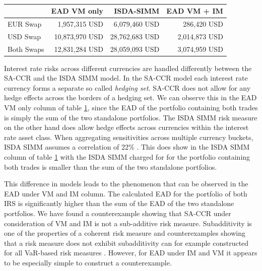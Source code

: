 \documentclass[../Thesis_AHoecherl.tex]{subfiles}
\begin{document}
    \begin{table}[htbp]
        \centering
        \begin{tabular}{l||r|r|r}
                & EAD VM only &ISDA-SIMM & EAD VM + IM \\
                \toprule
        EUR Swap & 1,957,315 USD & 6,079,460 USD & 286,420 USD \\
        USD Swap & 10,873,970 USD & 28,762,683 USD & 2,014,873 USD \\
        Both Swaps & 12,831,284 USD & 28,059,093 USD & 3,074,959 USD \\
        \end{tabular}%
        \caption{}
        \label{tab:2TradeRatesResults}%
    \end{table}%

    Interest rate risks across different currencies are handled differently between the SA-CCR and the ISDA SIMM model.
    In the SA-CCR model each interest rate currency forms a separate so called \emph{hedging set}. SA-CCR does not allow for any hedge effects across the borders of a hedging set.
    We can observe this in the EAD VM only column of table \ref{tab:2TradeRatesResults}, since the EAD of the portfolio containing both trades is simply the sum of the two standalone portfolios.
    The ISDA SIMM risk measure on the other hand does allow hedge effects across currencies within the interest rate asset class. When aggregating sensitivities across multiple currency buckets, ISDA SIMM assumes a correlation of 22\% \cite[Section D.2]{SIMM}.
    This does show in the ISDA SIMM column of table \ref{tab:2TradeRatesResults} with the ISDA SIMM charged for for the portfolio containing both trades is smaller than the sum of the two standalone portfolios.
    
    This difference in models leads to the phenomenon that can be observed in the EAD under VM and IM column. The calculated EAD for the portfolio of both IRS is significantly higher than the sum of the EAD of the two standalone portfolios.
    We have found a counterexample showing that SA-CCR under consideration of VM and IM is not a sub-additive risk measure.
    Subadditivity is one of the properties of a coherent risk measure  and counterexamples showing that a risk measure does not exhibit subadditivity can for example constructed for all VaR-based risk measures . However, for EAD under IM and VM it appears to be especially simple to construct a counterexample.
\end{document}
